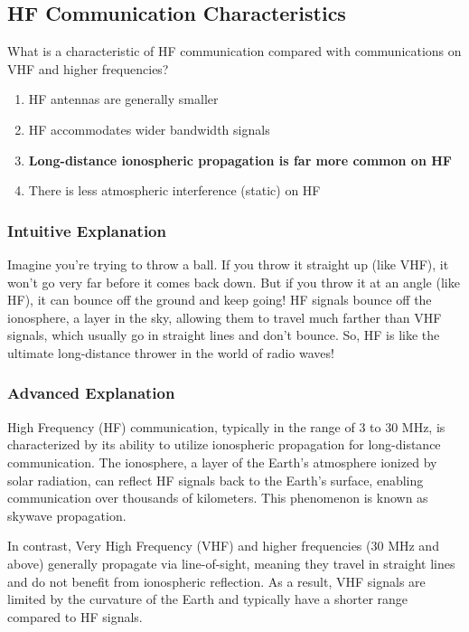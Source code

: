 \subsection{HF Communication Characteristics}
\label{T3C02}

\begin{tcolorbox}[colback=gray!10!white,colframe=black!75!black,title=T3C02]
What is a characteristic of HF communication compared with communications on VHF and higher frequencies?
\begin{enumerate}[label=\Alph*)]
    \item HF antennas are generally smaller
    \item HF accommodates wider bandwidth signals
    \item \textbf{Long-distance ionospheric propagation is far more common on HF}
    \item There is less atmospheric interference (static) on HF
\end{enumerate}
\end{tcolorbox}

\subsubsection*{Intuitive Explanation}
Imagine you're trying to throw a ball. If you throw it straight up (like VHF), it won't go very far before it comes back down. But if you throw it at an angle (like HF), it can bounce off the ground and keep going! HF signals bounce off the ionosphere, a layer in the sky, allowing them to travel much farther than VHF signals, which usually go in straight lines and don't bounce. So, HF is like the ultimate long-distance thrower in the world of radio waves!

\subsubsection*{Advanced Explanation}
High Frequency (HF) communication, typically in the range of 3 to 30 MHz, is characterized by its ability to utilize ionospheric propagation for long-distance communication. The ionosphere, a layer of the Earth's atmosphere ionized by solar radiation, can reflect HF signals back to the Earth's surface, enabling communication over thousands of kilometers. This phenomenon is known as skywave propagation.

In contrast, Very High Frequency (VHF) and higher frequencies (30 MHz and above) generally propagate via line-of-sight, meaning they travel in straight lines and do not benefit from ionospheric reflection. As a result, VHF signals are limited by the curvature of the Earth and typically have a shorter range compared to HF signals.

